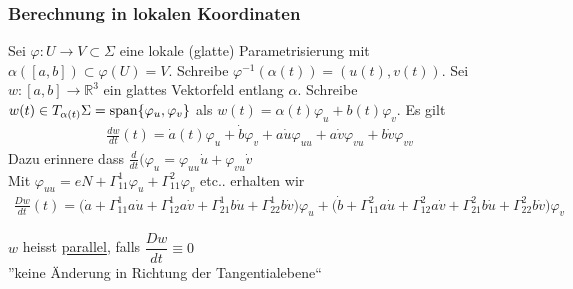 \documentclass[../main.tex]{subfiles}
\begin{document}
\subsubsection*{Berechnung in lokalen Koordinaten}
Sei $\varphi : U \to V \subset \Sigma$ eine lokale (glatte) Parametrisierung mit $\alpha([a,b]) \subset \varphi (U) = V$. Schreibe $\varphi^{-1}(\alpha(t))=(u(t),v(t))$.
Sei $w:[a,b]\to \mathbb{R}^3$ ein glattes Vektorfeld entlang $\alpha$. Schreibe $w(t) \in T_{\alpha(t)}\Sigma = \operatorname{span} \{ \varphi_u, \varphi_v \}$
als $w(t) = \alpha(t)\varphi_u + b(t)\varphi_v$. Es gilt
\begin{align*}
    \frac{dw}{dt}(t) = \dot{a}(t)\varphi_u + \dot{b}\varphi_v + a\dot{u}\varphi_{uu} + a\dot{v}\varphi_{vu} + b\dot{v}\varphi_{vv}
\end{align*}
Dazu erinnere dass $\frac{d}{dt}(\varphi_u = \varphi_{uu}\dot{u} + \varphi_{vu}\dot{v}$
\\
Mit $\varphi_{uu} = eN + \Gamma^1_{11}\varphi_u + \Gamma^2_{11}\varphi_v$ etc.. erhalten wir
\begin{align*}
    \frac{Dw}{dt}(t) = \big(\dot{a} + \Gamma^1_{11}a\dot{u} + \Gamma^1_{12}a\dot{v} + \Gamma^1_{21}b\dot{u} + \Gamma^1_{22}b\dot{v}\big) \varphi_u + \big(\dot{b} + \Gamma^2_{11}a\dot{u} + \Gamma^2_{12}a\dot{v} + \Gamma^2_{21}b\dot{u} + \Gamma^2_{22}b\dot{v}\big) \varphi_v
\end{align*}

\begin{definition}
$w$ heisst \underline{parallel}, falls $\dfrac{Dw}{dt} \equiv 0$ \\ ''keine Änderung in Richtung der Tangentialebene``
\end{definition}
\end{document}
